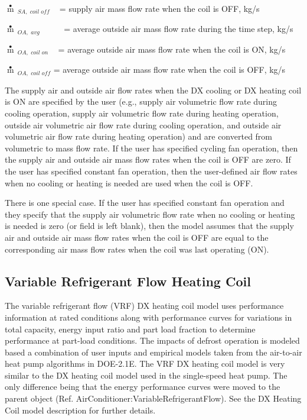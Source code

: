\(\mathop m\limits^ \bullet {\,_{SA,\,\,coil\,\,off}}\) ~ = supply air mass flow rate when the coil is OFF, kg/s

\(\mathop m\limits^ \bullet {\,_{OA,\,\,avg\,\,}}\) ~~~~ = average outside air mass flow rate during the time step, kg/s

\(\mathop m\limits^ \bullet {\,_{OA,\,\,coil\,\,on}}\) ~ = average outside air mass flow rate when the coil is ON, kg/s

\(\mathop m\limits^ \bullet {\,_{OA,\,\,coil\,\,off}}\) = average outside air mass flow rate when the coil is OFF, kg/s

The supply air and outside air flow rates when the DX cooling or DX heating coil is ON are specified by the user (e.g., supply air volumetric flow rate during cooling operation, supply air volumetric flow rate during heating operation, outside air volumetric air flow rate during cooling operation, and outside air volumetric air flow rate during heating operation) and are converted from volumetric to mass flow rate. If the user has specified cycling fan operation, then the supply air and outside air mass flow rates when the coil is OFF are zero. If the user has specified constant fan operation, then the user-defined air flow rates when no cooling or heating is needed are used when the coil is OFF.

There is one special case. If the user has specified constant fan operation and they specify that the supply air volumetric flow rate when no cooling or heating is needed is zero (or field is left blank), then the model assumes that the supply air and outside air mass flow rates when the coil is OFF are equal to the corresponding air mass flow rates when the coil was last operating (ON).

\subsection{Variable Refrigerant Flow Heating Coil}\label{variable-refrigerant-flow-heating-coil}

The variable refrigerant flow (VRF) DX heating coil model uses performance information at rated conditions along with performance curves for variations in total capacity, energy input ratio and part load fraction to determine performance at part-load conditions. The impacts of defrost operation is modeled based a combination of user inputs and empirical models taken from the air-to-air heat pump algorithms in DOE-2.1E. The VRF DX heating coil model is very similar to the DX heating coil model used in the single-speed heat pump. The only difference being that the energy performance curves were moved to the parent object (Ref. AirConditioner:VariableRefrigerantFlow). See the DX Heating Coil model description for further details.

